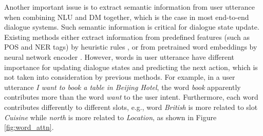 Another important issue is to extract semantic information from user utterance when combining NLU and DM together, which is the case in most end-to-end dialogue systems. Such semantic information is critical for dialogue state update. Existing methods either extract information from predefined features (such as POS and NER tags) by heuristic rules \cite{henderson2014word}, or from pretrained word embeddings by neural network encoder \cite{mrkvsic2016neural}.
However, words in user utterance have different importance for updating dialogue states and predicting the next action, which is not taken into consideration by previous methods. For example, in a user utterance \emph{I want to book a table in Beijing Hotel}, the word \emph{book} apparently contributes more than the word \emph{want} to the user intent. Furthermore, each word contributes differently to different slots, e.g., word \emph{British} is more related to slot \emph{Cuisine} while \emph{north} is more related to \emph{Location}, as shown in Figure \ref{fig:word_attn}.


